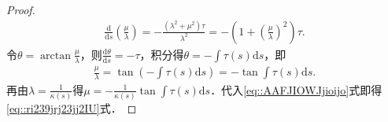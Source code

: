 \documentclass[../../main.tex]{subfiles}%
\begin{document}
\begin{proof}
\begin{align*}
\frac{\mathrm{d}}{\mathrm{d}s}\left(\frac{\mu}{\lambda}\right)=-\frac{(\lambda^2+\mu^2)\tau}{\lambda^2}=-\left(1+\left(\frac{\mu}{\lambda}\right)^2\right)\tau.
\end{align*}
令$\theta=\arctan\frac{\mu}{\lambda}$，则$\frac{\mathrm{d}\theta}{\mathrm{d}s}=-\tau$，积分得$\theta=-\int\tau(s)\mathrm{d}s$，即
\begin{align*}
\frac{\mu}{\lambda}=\tan\left(-\int\tau(s)\mathrm{d}s\right)=-\tan\int\tau(s)\mathrm{d}s.
\end{align*}
再由$\lambda=\frac{1}{\kappa(s)}$得$\mu=-\frac{1}{\kappa(s)}\tan\int\tau(s)\mathrm{d}s$．代入\eqref{eq::AAFJIOWJjioijo}式即得\eqref{eq::ri239jrj23jj2IU}式．

\end{proof}
\end{document}
